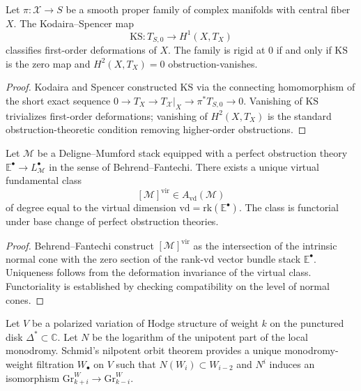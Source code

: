 \begin{theorem}\label{thm-kodaira-spencer}
Let $\pi : \mathcal X \to S$ be a smooth proper family of complex manifolds with central fiber $X$. The Kodaira--Spencer map
\[
\mathrm{KS} : T_{S,0} \to H^1(X, T_X)
\]
classifies first-order deformations of $X$. The family is rigid at $0$ if and only if $\mathrm{KS}$ is the zero map and $H^2(X, T_X) = 0$ obstruction-vanishes.
\end{theorem}

\begin{proof}
Kodaira and Spencer constructed $\mathrm{KS}$ via the connecting homomorphism of the short exact sequence
$0 \to T_X \to T_\mathcal X|_X \to \pi^* T_{S,0} \to 0$. Vanishing of $\mathrm{KS}$ trivializes first-order deformations; vanishing of $H^2(X,T_X)$ is the standard obstruction-theoretic condition removing higher-order obstructions.
\end{proof}

\begin{theorem}\label{thm-virtual-cycle}
Let $\mathcal M$ be a Deligne--Mumford stack equipped with a perfect obstruction theory $\mathbb E^\bullet \to L_{\mathcal M}^\bullet$ in the sense of Behrend--Fantechi. There exists a unique virtual fundamental class
\[
[\mathcal M]^{\mathrm{vir}} \in A_{\mathrm{vd}}(\mathcal M)
\]
of degree equal to the virtual dimension $\mathrm{vd} = \mathrm{rk}(\mathbb E^\bullet)$. The class is functorial under base change of perfect obstruction theories.
\end{theorem}

\begin{proof}
Behrend--Fantechi construct $[\mathcal M]^{\mathrm{vir}}$ as the intersection of the intrinsic normal cone with the zero section of the rank-$\mathrm{vd}$ vector bundle stack $\mathbb E^\bullet$. Uniqueness follows from the deformation invariance of the virtual class. Functoriality is established by checking compatibility on the level of normal cones.
\end{proof}

\begin{theorem}\label{thm-monodromy-weight}
Let $V$ be a polarized variation of Hodge structure of weight $k$ on the punctured disk $\Delta^* \subset \mathbb C$. Let $N$ be the logarithm of the unipotent part of the local monodromy. Schmid's nilpotent orbit theorem provides a unique monodromy-weight filtration $W_\bullet$ on $V$ such that $N(W_i) \subset W_{i-2}$ and $N^i$ induces an isomorphism $\mathrm{Gr}^W_{k+i} \to \mathrm{Gr}^W_{k-i}$.
\end{theorem}

